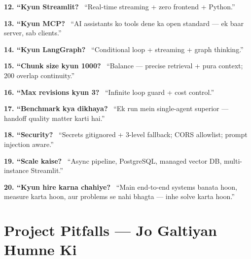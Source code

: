 \begin{interviewbox}
\textbf{12. ``Kyun Streamlit?} \ ``Real-time streaming + zero frontend + Python.''
\end{interviewbox}

\begin{interviewbox}
\textbf{13. ``Kyun MCP?} \ ``AI assistants ko tools dene ka open standard --- ek baar server, sab clients.''
\end{interviewbox}

\begin{interviewbox}
\textbf{14. ``Kyun LangGraph?} \ ``Conditional loop + streaming + graph thinking.''
\end{interviewbox}

\begin{interviewbox}
\textbf{15. ``Chunk size kyun 1000?} \ ``Balance --- precise retrieval + pura context; 200 overlap continuity.''
\end{interviewbox}

\begin{interviewbox}
\textbf{16. ``Max revisions kyun 3?} \ ``Infinite loop guard + cost control.''
\end{interviewbox}

\begin{interviewbox}
\textbf{17. ``Benchmark kya dikhaya?} \ ``Ek run mein single-agent superior --- handoff quality matter karti hai.''
\end{interviewbox}

\begin{interviewbox}
\textbf{18. ``Security?} \ ``Secrets gitignored + 3-level fallback; CORS allowlist; prompt injection aware.''
\end{interviewbox}

\begin{interviewbox}
\textbf{19. ``Scale kaise?} \ ``Async pipeline, PostgreSQL, managed vector DB, multi-instance Streamlit.''
\end{interviewbox}

\begin{interviewbox}
\textbf{20. ``Kyun hire karna chahiye?} \ ``Main end-to-end systems banata hoon, measure karta hoon, aur problems se nahi bhagta --- inhe solve karta hoon.'' 
\end{interviewbox}

\section{Project Pitfalls --- Jo Galtiyan Humne Ki}

